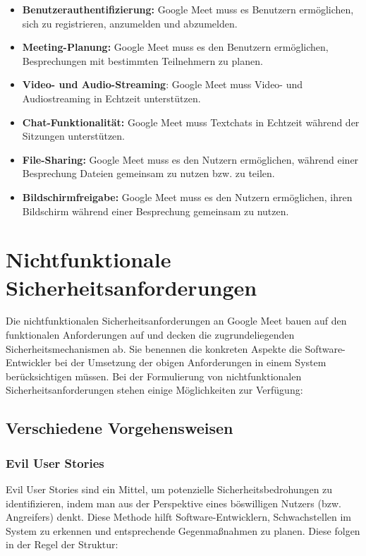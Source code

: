 \documentclass{article}
\begin{document}
\begin{itemize}
	\item \textbf{Benutzerauthentifizierung:} Google Meet muss es Benutzern ermöglichen, sich zu registrieren, anzumelden und abzumelden.
	\item \textbf{Meeting-Planung:} Google Meet muss es den Benutzern ermöglichen, Besprechungen mit bestimmten Teilnehmern zu planen.
	\item \textbf{Video- und Audio-Streaming}: Google Meet muss Video- und Audiostreaming in Echtzeit unterstützen.
	\item \textbf{Chat-Funktionalität:} Google Meet muss Textchats in Echtzeit während der Sitzungen unterstützen.
	\item \textbf{File-Sharing:} Google Meet muss es den Nutzern ermöglichen, während einer Besprechung Dateien gemeinsam zu nutzen bzw. zu teilen.
	\item \textbf{Bildschirmfreigabe:} Google Meet muss es den Nutzern ermöglichen, ihren Bildschirm während einer Besprechung gemeinsam zu nutzen.
\end{itemize}

\section{Nichtfunktionale Sicherheitsanforderungen}

Die nichtfunktionalen Sicherheitsanforderungen an Google Meet bauen auf den funktionalen 
Anforderungen auf und decken die zugrundeliegenden Sicherheitsmechanismen ab. Sie benennen 
die konkreten Aspekte die Software-Entwickler bei der Umsetzung der obigen Anforderungen 
in einem System berücksichtigen müssen. Bei der Formulierung von nichtfunktionalen 
Sicherheitsanforderungen stehen einige Möglichkeiten zur Verfügung:

\subsection{Verschiedene Vorgehensweisen}

\subsubsection{Evil User Stories}

Evil User Stories sind ein Mittel, um potenzielle Sicherheitsbedrohungen zu 
identifizieren, indem man aus der Perspektive eines böswilligen Nutzers (bzw. Angreifers) 
denkt. Diese Methode hilft Software-Entwicklern, Schwachstellen im System zu erkennen und 
entsprechende Gegenmaßnahmen zu planen.
Diese folgen in der Regel der Struktur:
\end{document}
